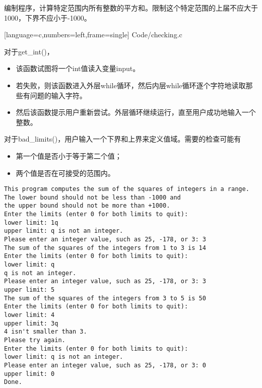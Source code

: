 \begin{frame}[fragile]\ft{\secname}
编制程序，计算特定范围内所有整数的平方和。限制这个特定范围的上届不应大于1000，下界不应小于-1000。
\end{frame}


\begin{frame}\ft{\secname}

[language=c,numbers=left,frame=single]
{Code/checking.c}
\end{frame}

\begin{frame}[fragile]\ft{\secname}
  对于{\tf get\_int()}，
\begin{itemize}
\item 
该函数试图将一个int值读入变量input。\\[0.1in]
\item 
若失败，则该函数进入外层while循环，然后内层while循环逐个字符地读取那些有问题的输入字符。\\[0.1in]
\item
然后该函数提示用户重新尝试。外层循环继续运行，直至用户成功地输入一个整数。
\end{itemize}

\end{frame}

\begin{frame}[fragile]\ft{\secname}
对于{\tf bad\_limits()}，用户输入一个下界和上界来定义值域。需要的检查可能有 \vspace{.1in}
\begin{itemize}
\item 第一个值是否小于等于第二个值；\\[0.1in]
\item 两个值是否在可接受的范围内。
\end{itemize}
\end{frame}

\begin{frame}\ft{\secname}
  \begin{lstlisting}
This program computes the sum of the squares of integers in a range.
The lower bound should not be less than -1000 and
the upper bound should not be more than +1000.
Enter the limits (enter 0 for both limits to quit):
lower limit: 1q
upper limit: q is not an integer.
Please enter an integer value, such as 25, -178, or 3: 3
The sum of the squares of the integers from 1 to 3 is 14
Enter the limits (enter 0 for both limits to quit):
lower limit: q
q is not an integer.
Please enter an integer value, such as 25, -178, or 3: 3
upper limit: 5
The sum of the squares of the integers from 3 to 5 is 50
Enter the limits (enter 0 for both limits to quit):
lower limit: 4
upper limit: 3q
4 isn't smaller than 3.
Please try again.
Enter the limits (enter 0 for both limits to quit):
lower limit: q is not an integer.
Please enter an integer value, such as 25, -178, or 3: 0
upper limit: 0
Done.
\end{lstlisting}
\end{frame}



